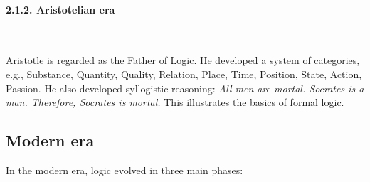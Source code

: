 \documentclass[12pt,a4paper]{book}
\begin{document}
\paragraph{2.1.2. Aristotelian era}\label{aristotelian-era}\

\href{https://id.wikipedia.org/wiki/Aristoteles}{Aristotle} is regarded
as the Father of Logic. He developed a system of categories, e.g.,
Substance, Quantity, Quality, Relation, Place, Time, Position, State,
Action, Passion. He also developed syllogistic reasoning:  
\emph{All men are mortal. Socrates is a man. Therefore, Socrates is
mortal.} This illustrates the basics of formal logic.

\subsection{Modern era}\label{modern-era}
In the modern era, logic evolved in three main phases:
\end{document}
